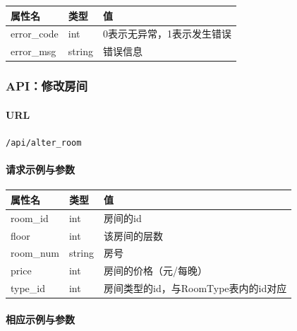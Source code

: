 \documentclass[]{article}
\let\oldparagraph\paragraph
\renewcommand{\paragraph}[1]{\oldparagraph{#1}\mbox{}}
\begin{document}
\begin{longtable}[]{@{}lll@{}}
\toprule
属性名 & 类型 & 值\tabularnewline
\midrule
\endhead
error\_code & int & 0表示无异常，1表示发生错误\tabularnewline
error\_msg & string & 错误信息\tabularnewline
\bottomrule
\end{longtable}

\hypertarget{apiux4feeux6539ux623fux95f4}{%
\subsubsection{API：修改房间}\label{apiux4feeux6539ux623fux95f4}}

\hypertarget{url-15}{%
\paragraph{URL}\label{url-15}}

\texttt{/api/alter\_room}

\hypertarget{ux8bf7ux6c42ux793aux4f8bux4e0eux53c2ux6570-2}{%
\paragraph{请求示例与参数}\label{ux8bf7ux6c42ux793aux4f8bux4e0eux53c2ux6570-2}}

\begin{Shaded}
\begin{Highlighting}[]
\FunctionTok{\{}
    \FunctionTok{:}\FunctionTok{,}
    \FunctionTok{:}\FunctionTok{,}
    \FunctionTok{:}\FunctionTok{,}
    \FunctionTok{:}\FunctionTok{,}
    \FunctionTok{:}
\FunctionTok{\}}
\end{Highlighting}
\end{Shaded}

\begin{longtable}[]{@{}lll@{}}
\toprule
属性名 & 类型 & 值\tabularnewline
\midrule
\endhead
room\_id & int & 房间的id\tabularnewline
floor & int & 该房间的层数\tabularnewline
room\_num & string & 房号\tabularnewline
price & int & 房间的价格（元/每晚）\tabularnewline
type\_id & int & 房间类型的id，与RoomType表内的id对应\tabularnewline
\bottomrule
\end{longtable}

\hypertarget{ux76f8ux5e94ux793aux4f8bux4e0eux53c2ux6570-2}{%
\paragraph{相应示例与参数}\label{ux76f8ux5e94ux793aux4f8bux4e0eux53c2ux6570-2}}
\end{document}
